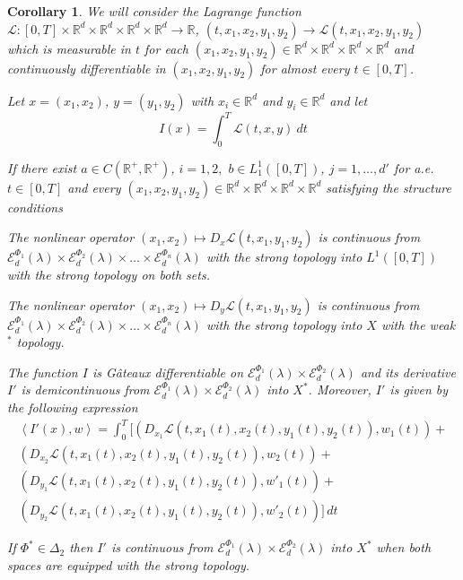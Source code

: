 \documentclass[twoside]{article}
\newtheorem{cor}[thm]{Corollary}
\theoremstyle{remark}
\newcommand{\domiuno}{\mathcal{E}^{\Phi_1}_d(\lambda)}
\newcommand{\domidos}{\mathcal{E}^{\Phi_2}_d(\lambda)}
\newcommand{\domin}{\mathcal{E}^{\Phi_n}_d(\lambda)}
\newcommand{\rr}{\mathbb{R}}
\renewcommand{\leq}{\leqslant}
\newcommand{\Phie}{\Phi^{*}}
\begin{document}
\begin{cor}
We will consider the Lagrange function
$\mathcal{L}:[0,T]\times\rr^d\times\rr^d\times\rr^d\times\rr^d\to\rr$, $(t,x_1,x_2,y_1,y_2)\to \mathcal{L}(t,x_1,x_2,y_1,y_2)$
which is measurable in $t$ for each $(x_1,x_2,y_1,y_2)\in \rr^d\times\rr^d\times\rr^d\times\rr^d$ and continuously differentiable 
in $(x_1,x_2,y_1,y_2)$ for almost every $t \in [0,T]$. 

Let $x=(x_1,x_2)$, $y=(y_1,y_2)$ with $x_i \in \rr^d$ and $y_i \in \rr^d$ and let 
\begin{equation}\label{integral_accion}
I(x)=\int_{0}^T \mathcal{L}(t,x,y)\ dt
\end{equation}


If there exist $a\in C(\rr^+,\rr^+)$, $i=1,2,$
$b \in L^1_1([0,T])$, $j=1,\dots,d'$ for a.e. $t \in [0, T]$ and 
every $(x_1,x_2,y_1,y_2)\in \rr^d\times\rr^d\times\rr^d\times\rr^d$ satisfying the structure conditions 


The nonlinear operator $(x_1,x_2)\mapsto D_x\mathcal{L}(t,x_1,y_1, y_2)$ is continuous from $\domiuno\times\domidos\times\dots\times\domin$ with the strong topology  into $L^1([0,T])$  with the strong topology on both sets.

The nonlinear operator $(x_1,x_2)\mapsto D_y\mathcal{L}(t,x_1,y_1, y_2)$ is continuous from $\domiuno\times\domidos\times\dots\times\domin$ with the strong topology  into $X$  with the weak$^*$ topology.


The function  $I$ is G\^ateaux differentiable on $\domiuno\times \domidos$ and  its derivative $I'$ is demicontinuous from $\domiuno\times\domidos$  into $X^*$. Moreover, $I'$ is given by the following expression
\begin{equation}\label{DerAccion}
\begin{split}
\left\langle I'(x),w \right\rangle=\int_0^T 
[
(D_{x_1}\mathcal{L}(t,x_1(t),x_2(t),y_1(t),y_2(t)),w_1(t))+
\\
(D_{x_2}\mathcal{L}(t,x_1(t),x_2(t),y_1(t),y_2(t)),w_2(t))+
\\
(D_{y_1}\mathcal{L}(t,x_1(t),x_2(t),y_1(t),y_2(t)),w'_1(t))+
\\
(D_{y_2}\mathcal{L}(t,x_1(t),x_2(t),y_1(t),y_2(t)),w'_2(t))
]\,dt
\end{split}
\end{equation}

If  $\Phie \in \Delta_2$ then
  $I'$ is continuous from $\domiuno\times\domidos$ into $X^*$ when both spaces are equipped with the strong topology.
\end{cor}
\end{document}
